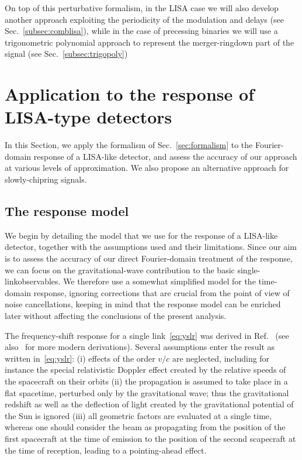 \documentclass[aps,showpacs,twocolumn,
prd,superscriptaddress,nofootinbib]{revtex4-1}
\begin{document}
On top of this perturbative formalism, in the LISA case we will also develop another approach exploiting the periodicity of the modulation and delays (see Sec.~\ref{subsec:comblisa}), while in the case of precessing binaries we will use a trigonometric polynomial approach to represent the merger-ringdown part of the signal (see Sec.~\ref{subsec:trigopoly})


\section{Application to the response of LISA-type detectors}
\label{sec:LISA}

In this Section, we apply the formalism of Sec.~\ref{sec:formalism} to the Fourier-domain response of a LISA-like detector, and assess the accuracy of our approach at various levels of approximation. We also propose an alternative approach for slowly-chipring signals. 


\subsection{The response model}
\label{subsec:modelLISA}

We begin by detailing the model that we use for the response of a LISA-like detector, together with the assumptions used and their limitations. Since our aim is to assess the accuracy of our direct Fourier-domain treatment of the response, we can focus on the gravitational-wave contribution to the basic single-linkobservables. We therefore use a somewhat simplified model for the time-domain response, ignoring corrections that are crucial from the point of view of noise cancellations, keeping in mind that the response model can be enriched later without affecting the conclusions of the present analysis.

The frequency-shift response for a single link~\eqref{eq:yslr} was derived in Ref.~\cite{EW75} (see also~\cite{RCP04, Finn08, Cornish09} for more modern derivations). Several assumptions enter the result as written in~\eqref{eq:yslr}: (i) effects of the order $v/c$ are neglected, including for instance the special relativistic Doppler effect created by the relative speeds of the spacecraft on their orbits (ii) the propagation is assumed to take place in a flat spacetime, perturbed only by the gravitational wave; thus the gravitational redshift as well as the deflection of light created by the gravitational potential of the Sun is ignored (iii) all geometric factors are evaluated at a single time, whereas one should consider the beam as propagating from the position of the first spacecraft at the time of emission to the position of the second scapecraft at the time of reception, leading to a pointing-ahead effect.
\end{document}
